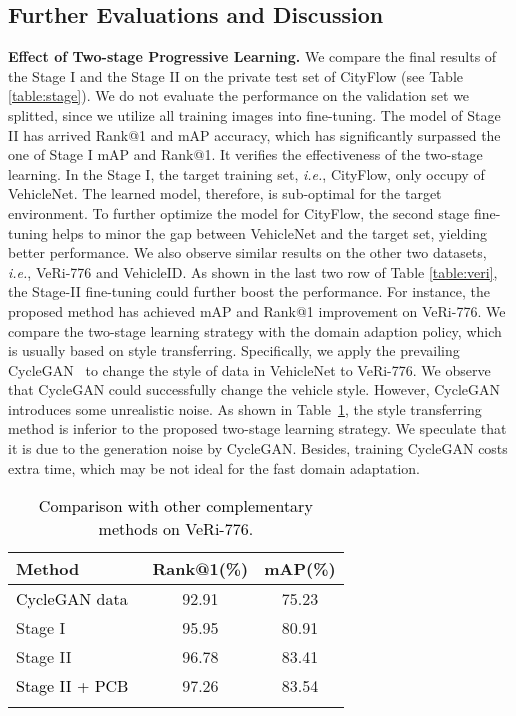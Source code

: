 \documentclass[journal]{IEEEtran}
\def\ie{\emph{i.e.}}
\newcommand{\zznote}[1]{\textcolor{black}{#1}}
\begin{document}
\subsection{Further Evaluations and Discussion} \label{sec:further}
\noindent \textbf{Effect of Two-stage Progressive Learning.} We compare the final results of the Stage I and the Stage II on the private test set of CityFlow (see Table \ref{table:stage}). We do not  evaluate the performance on the validation set we splitted, since we utilize all training images into fine-tuning. The model of Stage II has arrived  Rank@1 and  mAP accuracy, which has significantly surpassed the one of Stage I  mAP and  Rank@1. It verifies the effectiveness of the two-stage learning. In the Stage I, the target training set, \ie, CityFlow, only occupy  of VehicleNet. The learned model, therefore, is sub-optimal for the target environment. To further optimize the model for CityFlow, the second stage fine-tuning helps to minor the gap between VehicleNet and the target set, yielding better performance. We also observe similar results on the other two datasets, \ie, VeRi-776 and VehicleID. As shown in the last two row of Table \ref{table:veri}, the Stage-II fine-tuning could further boost the performance. For instance, the proposed method has achieved  mAP and  Rank@1 improvement on VeRi-776. 
We compare the two-stage learning strategy with the domain adaption policy, which is usually based on style transferring. Specifically, we apply the prevailing CycleGAN~\cite{zhu2017toward} to change the style of data in VehicleNet to VeRi-776. We observe that CycleGAN could successfully change the vehicle style. However, CycleGAN introduces some unrealistic noise. As shown in Table~\ref{table:complementary}, the style transferring method is inferior to the proposed two-stage learning strategy. We speculate that it is due to the generation noise by CycleGAN. Besides, training CycleGAN costs extra time, which may be not ideal for the fast domain adaptation.

\begin{table}
\caption{\zznote{Comparison with other complementary methods on VeRi-776.}}
\vspace{-.2in}
\label{table:complementary}
\begin{center}
{
\setlength{\tabcolsep}{15pt}
\begin{tabular}{l | c c}
\shline
 Method  & Rank@1(\%) & mAP(\%) \\
\hline 
\zznote{ CycleGAN data} & 92.91 & 75.23 \\ 
\hline
Stage I & 95.95 &  80.91 \\
Stage II & 96.78 &  83.41 \\
\zznote{Stage II + PCB~\cite{sun2017beyond}} & 97.26 &  83.54 \\
\shline
\end{tabular}}
\end{center}
\vspace{-.2in}
\end{table}
\end{document}
